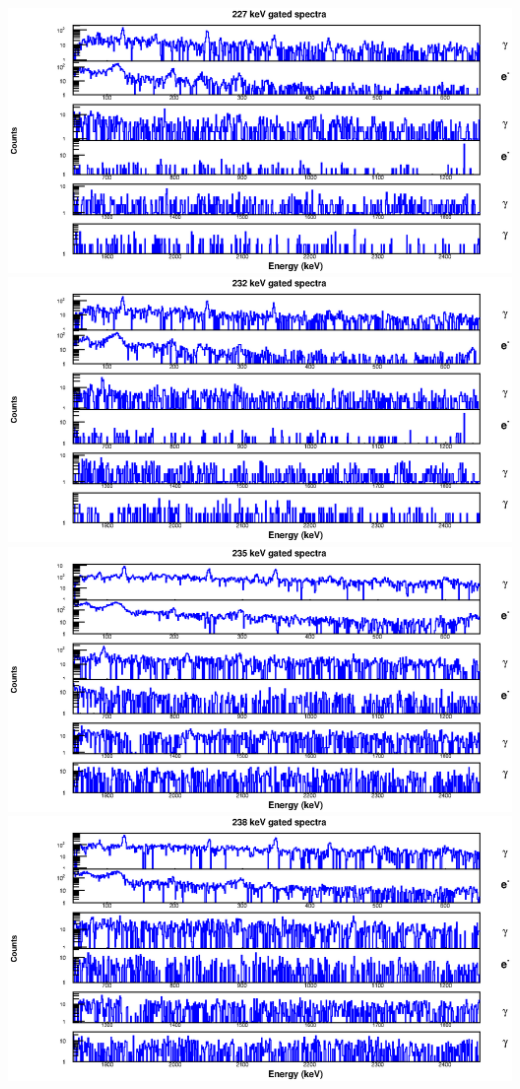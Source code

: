 \begin{landscape}
\includegraphics[scale=1.2]{154Gd_Appendix/227_combined.eps}
\includegraphics[scale=1.2]{154Gd_Appendix/232_combined.eps}
\includegraphics[scale=1.2]{154Gd_Appendix/235_combined.eps}
\includegraphics[scale=1.2]{154Gd_Appendix/238_combined.eps}

\end{landscape}
